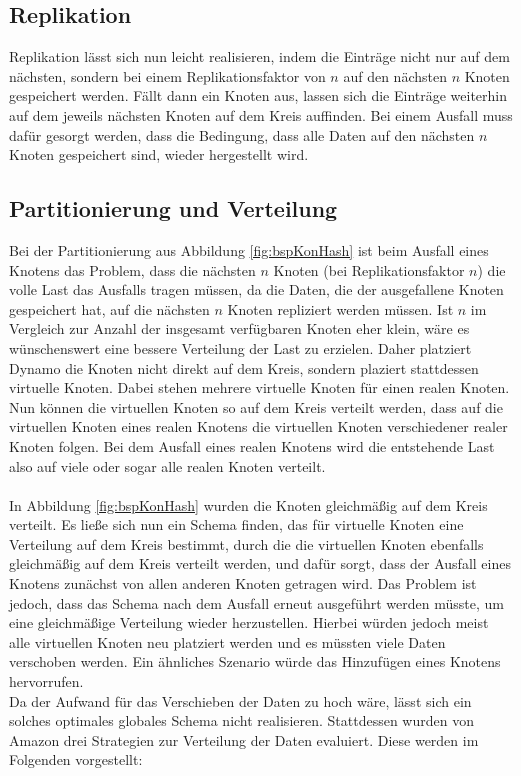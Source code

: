 \subsection{Replikation}
Replikation lässt sich nun leicht realisieren, indem die Einträge nicht nur auf dem nächsten, sondern bei einem Replikationsfaktor von $n$ auf den nächsten $n$ Knoten gespeichert werden. Fällt dann ein Knoten aus, lassen sich die Einträge weiterhin auf dem jeweils nächsten Knoten auf dem Kreis auffinden. Bei einem Ausfall muss dafür gesorgt werden, dass die Bedingung, dass alle Daten auf den nächsten $n$ Knoten gespeichert sind, wieder hergestellt wird.
\subsection{Partitionierung und Verteilung}
Bei der Partitionierung aus Abbildung \ref{fig:bspKonHash} ist beim Ausfall eines Knotens das Problem, dass die nächsten $n$ Knoten (bei Replikationsfaktor $n$) die volle Last das Ausfalls tragen müssen, da die Daten, die der ausgefallene Knoten gespeichert hat, auf die nächsten $n$ Knoten repliziert werden müssen. Ist $n$ im Vergleich zur Anzahl der insgesamt verfügbaren Knoten eher klein, wäre es wünschenswert eine bessere Verteilung der Last zu erzielen. Daher platziert Dynamo die Knoten nicht direkt auf dem Kreis, sondern plaziert stattdessen virtuelle Knoten. Dabei stehen mehrere virtuelle Knoten für einen realen Knoten. Nun können die virtuellen Knoten so auf dem Kreis verteilt werden, dass auf die virtuellen Knoten eines realen Knotens die virtuellen Knoten verschiedener realer Knoten folgen. Bei dem Ausfall eines realen Knotens wird die entstehende Last also auf viele oder sogar alle realen Knoten verteilt.\\
\\
In Abbildung \ref{fig:bspKonHash} wurden die Knoten gleichmäßig auf dem Kreis verteilt. Es ließe sich nun ein Schema finden, das für virtuelle Knoten eine Verteilung auf dem Kreis bestimmt, durch die die virtuellen Knoten ebenfalls gleichmäßig auf dem Kreis verteilt werden, und dafür sorgt, dass der Ausfall eines Knotens zunächst von allen anderen Knoten getragen wird. Das Problem ist jedoch, dass das Schema nach dem Ausfall erneut ausgeführt werden müsste, um eine gleichmäßige Verteilung wieder herzustellen. Hierbei würden jedoch meist alle virtuellen Knoten neu platziert werden und es müssten viele Daten verschoben werden. Ein ähnliches Szenario würde das Hinzufügen eines Knotens hervorrufen.\\
Da der Aufwand für das Verschieben der Daten zu hoch wäre, lässt sich ein solches optimales globales Schema nicht realisieren. Stattdessen wurden von Amazon drei Strategien zur Verteilung der Daten evaluiert. Diese werden im Folgenden vorgestellt:
